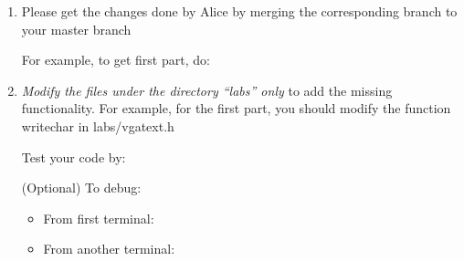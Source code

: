 \documentclass[]{book}
\newenvironment{Shaded}{}{}
\newcommand{\KeywordTok}[1]{\textbf{{#1}}}
\newcommand{\NormalTok}[1]{{#1}}
\begin{document}
\begin{enumerate}
\def\labelenumi{\arabic{enumi}.}
\item
  Please get the changes done by Alice by merging the corresponding
  branch to your master branch

\begin{Shaded}
\end{Shaded}

  For example, to get first part, do:

\begin{Shaded}
\end{Shaded}
\item
  \emph{Modify the files under the directory ``labs'' only } to add the
  missing functionality. For example, for the first part, you should
  modify the function writechar in labs/vgatext.h

\begin{Shaded}
\end{Shaded}

  Test your code by:

\begin{Shaded}
\end{Shaded}

  (Optional) To debug:

  \begin{itemize}
  \item
    From first terminal:

\begin{Shaded}
\end{Shaded}
  \item
    From another terminal:


\end{itemize}
\end{enumerate}
\end{document}

